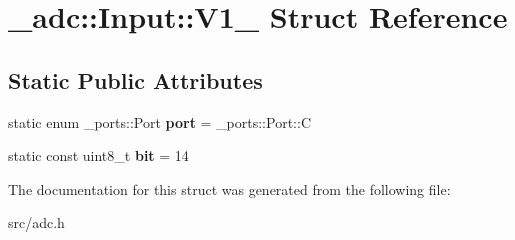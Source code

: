 \hypertarget{struct__adc_1_1Input_1_1V1__1}{}\section{\+\_\+adc\+:\+:Input\+:\+:V1\+\_ Struct Reference}
\label{struct__adc_1_1Input_1_1V1__1}
\subsection*{Static Public Attributes}
\begin{DoxyCompactItemize}
\item 
static enum \+\_\+ports\+::\+Port {\bfseries port} = \+\_\+ports\+::\+Port\+::C\hypertarget{struct__adc_1_1Input_1_1V1__1_accf4b00c43bdeb50937842b5fe8ef683}{}\label{struct__adc_1_1Input_1_1V1__1_accf4b00c43bdeb50937842b5fe8ef683}

\item 
static const uint8\+\_\+t {\bfseries bit} = 14\hypertarget{struct__adc_1_1Input_1_1V1__1_a1c0337862fb02a2b8dbc4aab44940df7}{}\label{struct__adc_1_1Input_1_1V1__1_a1c0337862fb02a2b8dbc4aab44940df7}

\end{DoxyCompactItemize}


The documentation for this struct was generated from the following file\+:\begin{DoxyCompactItemize}
\item 
src/adc.\+h\end{DoxyCompactItemize}
